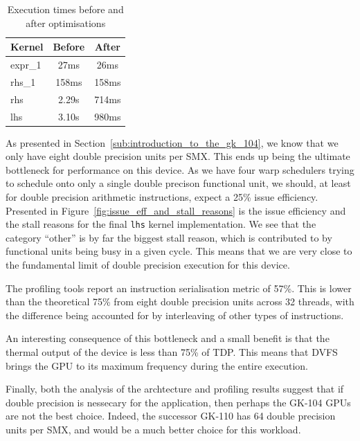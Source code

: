 \documentclass[11pt, oneside, a4paper]{article}
\begin{document}
\begin{table}[tb]
	\caption{Execution times before and after optimisations}
	\label{tab:exetimes}
	\begin{center}
		\begin{tabular}{l|cc}
		\hline

		\hline
		\textbf{Kernel} & \textbf{Before} & \textbf{After} \\
		\hline
			expr\_1 & 27ms & 26ms \\
			rhs\_1 & 158ms & 158ms \\
			rhs & 2.29s & 714ms \\
			lhs & 3.10s & 980ms \\
		\hline

		\hline
		\end{tabular}
	\end{center}
\end{table}

As presented in Section~\ref{sub:introduction_to_the_gk_104}, we know that we only have eight double precision units per SMX. This ends up being the ultimate bottleneck for performance on this device.
As we have four warp schedulers trying to schedule onto only a single double precison functional unit, we should, at least for double precision arithmetic instructions, expect a 25\% issue efficiency.
Presented in Figure~\ref{fig:issue_eff_and_stall_reasons} is the issue efficiency and the stall reasons for the final \texttt{lhs} kernel implementation.
We see that the category ``other'' is by far the biggest stall reason, which is contributed to by functional units being busy in a given cycle.
This means that we are very close to the fundamental limit of double precision execution for this device.


The profiling tools report an instruction serialisation metric of 57\%. This is lower than the theoretical 75\% from eight double precision units across 32 threads, with the difference being accounted for by interleaving of other types of instructions.

An interesting consequence of this bottleneck and a small benefit is that the thermal output of the device is less than 75\% of TDP. This means that DVFS brings the GPU to its maximum frequency during the entire execution.

Finally, both the analysis of the archtecture and profiling results suggest that if double precision is nessecary for the application, then perhaps the GK-104 GPUs are not the best choice. Indeed, the successor GK-110 has 64 double precision units per SMX, and would be a much better choice for this workload.
\end{document}
